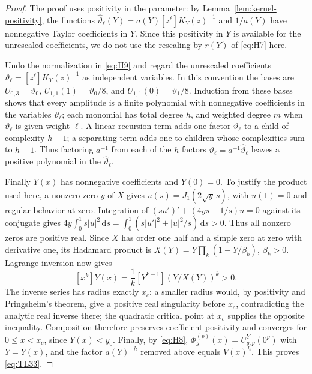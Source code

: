 \begin{proof}
The proof uses positivity in the parameter: by
Lemma~\ref{lem:kernel-positivity}, the functions
\(\widehat\vartheta_\ell(Y)=a(Y)[z^\ell]K_Y(z)^{-1}\) and \(1/a(Y)\) have
nonnegative Taylor coefficients in \(Y\). Since this positivity in \(Y\) is
available for the unrescaled coefficients, we do not use the rescaling by
\(r(Y)\) of \eqref{eq:H7} here.

Undo the normalization in \eqref{eq:H9} and regard the unrescaled coefficients \(\vartheta_\ell=[z^\ell]K_Y(z)^{-1}\) as independent variables. In this convention the bases are \(U_{0,3}=\vartheta_0\), \(U_{1,1}(1)=\vartheta_0/8\), and \(U_{1,1}(0)=\vartheta_1/8\). Induction from these bases shows that every amplitude is a finite polynomial with nonnegative
coefficients in the variables \(\vartheta_\ell\); each monomial has total degree \(h\),
and weighted degree \(m\) when \(\vartheta_\ell\) is given weight \(\ell\). A
linear recursion term adds one factor \(\vartheta_\ell\) to a child of complexity \(h-1\); a
separating term adds one to children whose complexities sum to \(h-1\).
Thus factoring \(a^{-1}\) from each of the \(h\) factors \(\vartheta_\ell=a^{-1}\widehat\vartheta_\ell\) leaves a
positive polynomial in the \(\widehat\vartheta_\ell\).

Finally \(Y(x)\) has nonnegative coefficients and \(Y(0)=0\). To justify
the product used here, a nonzero zero \(y\) of \(X\) gives
\(u(s)=J_1(2\sqrt y\,s)\), with \(u(1)=0\) and regular behavior at zero.
Integration of \((s u')'+(4ys-1/s)u=0\) against its conjugate gives
\(4y\int_0^1s|u|^2\,\mathrm{d}s=\int_0^1(s|u'|^2+|u|^2/s)\,\mathrm{d}s>0\). Thus all
nonzero zeros are positive real. Since \(X\) has order one half and a
simple zero at zero with derivative one, its Hadamard product is
\(X(Y)=Y\prod_k(1-Y/\beta_k)\), \(\beta_k>0\). Lagrange inversion now
gives \[
 [x^k]Y(x)=\frac1k[Y^{k-1}](Y/X(Y))^k>0.
\] The inverse series has radius exactly \(x_c\): a smaller radius
would, by positivity and Pringsheim's theorem, give a positive real
singularity before \(x_c\), contradicting the analytic real inverse
there; the quadratic critical point at \(x_c\) supplies the opposite
inequality. Composition therefore preserves coefficient positivity and
converges for \(0\le x<x_c\), since \(Y(x)<y_0\). Finally, by
\eqref{eq:H8}, \(\Phi_g^{(p)}(x)=U^{Y}_{g,p}(0^p)\) with \(Y=Y(x)\), and the
factor \(a(Y)^{-h}\) removed above equals \(V(x)^h\). This proves
\eqref{eq:TL33}.
\end{proof}

